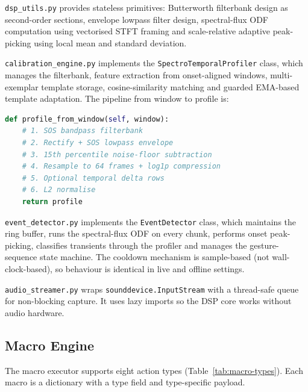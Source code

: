 \documentclass[12pt,a4paper]{article}
\begin{document}
\texttt{dsp\_utils.py} provides stateless primitives: Butterworth filterbank design as second-order sections, envelope lowpass filter design, spectral-flux ODF computation using vectorised STFT framing and scale-relative adaptive peak-picking using local mean and standard deviation.

\texttt{calibration\_engine.py} implements the \texttt{SpectroTemporalProfiler} class, which manages the filterbank, feature extraction from onset-aligned windows, multi-exemplar template storage, cosine-similarity matching and guarded EMA-based template adaptation. The pipeline from window to profile is:

\begin{lstlisting}[language=Python]
def profile_from_window(self, window):
    # 1. SOS bandpass filterbank
    # 2. Rectify + SOS lowpass envelope
    # 3. 15th percentile noise-floor subtraction
    # 4. Resample to 64 frames + log1p compression
    # 5. Optional temporal delta rows
    # 6. L2 normalise
    return profile
\end{lstlisting}

\texttt{event\_detector.py} implements the \texttt{EventDetector} class, which maintains the ring buffer, runs the spectral-flux ODF on every chunk, performs onset peak-picking, classifies transients through the profiler and manages the gesture-sequence state machine. The cooldown mechanism is sample-based (not wall-clock-based), so behaviour is identical in live and offline settings.

\texttt{audio\_streamer.py} wraps \texttt{sounddevice.InputStream} with a thread-safe queue for non-blocking capture. It uses lazy imports so the DSP core works without audio hardware.

\subsection{Macro Engine}

The macro executor supports eight action types (Table~\ref{tab:macro-types}). Each macro is a dictionary with a type field and type-specific payload.
\end{document}

